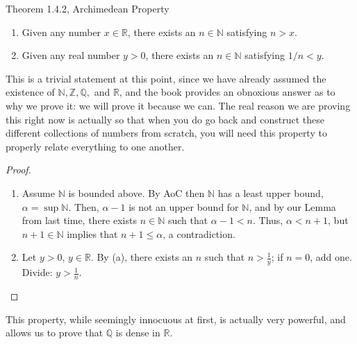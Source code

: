 \documentclass{ximera}
\begin{document}
\begin{theorem}{Theorem 1.4.2, Archimedean Property}
\begin{enumerate}
    \item Given any number $x \in \mathbb{R}$, there exists an $n \in \mathbb{N}$ satisfying $n > x$.
    \item Given any real number $y > 0$, there exists an $n \in \mathbb{N}$ satisfying $1/n < y$.
\end{enumerate}
\end{theorem}
This is a trivial statement at this point, since we have already assumed the existence of $\mathbb{N}, \mathbb{Z}, \mathbb{Q},$ and $\mathbb{R}$, and the book provides an obnoxious answer as to why we prove it: we will prove it because we can.  The real reason we are proving this right now is actually so that when you do go back and construct these different collections of numbers from scratch, you will need this property to properly relate everything to one another.

\begin{proof}
\phantom{blah}

\begin{enumerate}
    \item Assume $\mathbb{N}$ is bounded above.  By AoC then $\mathbb{N}$ has a least upper bound, $\alpha = \sup\mathbb{N}$.  Then, $\alpha - 1$ is not an upper bound for $\mathbb{N}$, and by our Lemma from last time, there exists $n \in \mathbb{N}$ such that $\alpha - 1 < n$.  Thus, $\alpha < n+1$, but $n + 1 \in \mathbb{N}$ implies that $n+1 \leq \alpha$, a contradiction.  
    \item Let $y > 0$, $y \in \mathbb{R}$.  By (a), there exists an $n$ such that $n > \frac{1}y$; if $n = 0$, add one.  Divide: $y > \frac{1}n$.
    \end{enumerate}
\end{proof}

This property, while seemingly innocuous at first, is actually very powerful, and allows us to prove that $\mathbb{Q}$ is dense in $\mathbb{R}$.
\end{document}
